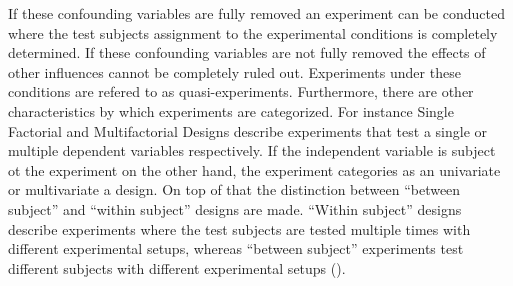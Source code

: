 If these confounding variables are fully removed an experiment can be conducted where the test subjects assignment to the experimental conditions is completely determined. If these confounding variables are not fully removed the effects of other influences cannot be completely ruled out. Experiments under these conditions are refered to as quasi-experiments.  
Furthermore, there are other characteristics by which experiments are categorized. For instance Single Factorial and Multifactorial Designs describe experiments that test a single or multiple dependent variables respectively. If the independent variable is subject ot the experiment on the other hand, the experiment categories as an univariate or multivariate a design. On top of that the distinction between \enquote{between subject} and \enquote{within subject} designs are made. \enquote{Within subject} designs describe experiments where the test subjects are tested multiple times with different experimental setups, whereas \enquote{between subject} experiments test different subjects with different experimental setups (\cite{Gniewosz.2011}). 